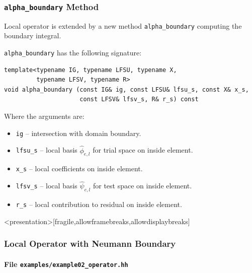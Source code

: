 \begin{frame}[fragile]
\frametitle{\lstinline{alpha_boundary} Method}
Local operator is extended by a new method \lstinline{alpha_boundary}
computing the boundary integral.

\lstinline{alpha_boundary} has the following signature: 
\begin{lstlisting}[basicstyle=\ttfamily\scriptsize]
template<typename IG, typename LFSU, typename X, 
         typename LFSV, typename R>
void alpha_boundary (const IG& ig, const LFSU& lfsu_s, const X& x_s, 
                     const LFSV& lfsv_s, R& r_s) const
\end{lstlisting}
Where the arguments are:
\begin{itemize}
\item \lstinline{ig} -- intersection with domain boundary.
\item \lstinline{lfsu_s} -- local basis $\hat\phi_{e,l}$ for trial space on inside element.
\item \lstinline{x_s} -- local coefficients on inside element.
\item \lstinline{lfsv_s} -- local basis $\hat\psi_{e,l}$ for test space on inside element. 
\item \lstinline{r_s} -- local contribution to residual on inside element.
\end{itemize}
\end{frame}


\begin{frame}<presentation>[fragile,allowframebreaks,allowdisplaybreaks]
\frametitle<presentation>{Local Operator with Neumann Boundary}
\framesubtitle<presentation>{File \texttt{examples/example02\_operator.hh}}

\end{frame}

